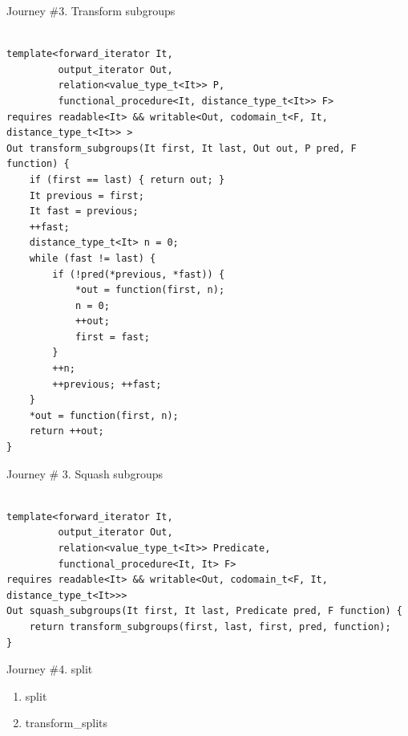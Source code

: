 \documentclass[10pt]{beamer}
\begin{document}
\begin{frame}[fragile]{Journey \#3. Transform subgroups}
\begin{lstlisting}[style=cpp]

template<forward_iterator It,
         output_iterator Out,
         relation<value_type_t<It>> P,
         functional_procedure<It, distance_type_t<It>> F>
requires readable<It> && writable<Out, codomain_t<F, It, distance_type_t<It>> >
Out transform_subgroups(It first, It last, Out out, P pred, F function) {
    if (first == last) { return out; }
    It previous = first;
    It fast = previous;
    ++fast;
    distance_type_t<It> n = 0;
    while (fast != last) {
        if (!pred(*previous, *fast)) {
            *out = function(first, n);
            n = 0;
            ++out;
            first = fast;
        }
        ++n;
        ++previous; ++fast;
    }
    *out = function(first, n);
    return ++out;
}

\end{lstlisting}
\end{frame}



\begin{frame}[fragile]{Journey \# 3. Squash subgroups}
\begin{lstlisting}[style=cpp]

template<forward_iterator It,
         output_iterator Out,
         relation<value_type_t<It>> Predicate,
         functional_procedure<It, It> F>
requires readable<It> && writable<Out, codomain_t<F, It, distance_type_t<It>>>
Out squash_subgroups(It first, It last, Predicate pred, F function) {
    return transform_subgroups(first, last, first, pred, function);
}

\end{lstlisting}
\end{frame}

\begin{frame}{Journey \#4. split}
    \begin{enumerate}
        \item split
        \item transform\_splits
    \end{enumerate}
\end{frame}
\end{document}
